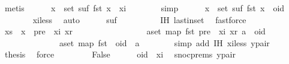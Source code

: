\begin{isabellebody}
\ metis\isanewline
\ \ \ \ \isamarkupfalse%
\ {\isachardoublequoteopen}{\isasymforall}x\ {\isasymin}\ set\ suf{\isachardot}\ fst\ x\ {\isacharless}\ xi{\isachardoublequoteclose}\isanewline
\ \ \ \ \ \ \isamarkupfalse%
\ simp\isanewline
\ \ \ \ \isamarkupfalse%
\ {\isachardoublequoteopen}{\isasymforall}x\ {\isasymin}\ set\ suf{\isachardot}\ fst\ x\ {\isacharless}\ oid{\isachardoublequoteclose}\isanewline
\ \ \ \ \ \ \isamarkupfalse%
\ xi{\isacharunderscore}less\ \isamarkupfalse%
\ auto\isanewline
\ \ \ \ \isamarkupfalse%
\ {\isachardoublequoteopen}suf\ {\isacharequal}\ {\isacharbrackleft}{\isacharbrackright}{\isachardoublequoteclose}\isanewline
\ \ \ \ \ \ \isamarkupfalse%
\ IH\ last{\isacharunderscore}in{\isacharunderscore}set\ \isamarkupfalse%
\ fastforce\isanewline
\ \ \ \ \isamarkupfalse%
\ {\isachardoublequoteopen}xs\ {\isacharat}\ {\isacharbrackleft}x{\isacharbrackright}\ {\isacharequal}\ {\isacharparenleft}pre\ {\isacharat}\ {\isacharbrackleft}{\isacharparenleft}xi{\isacharcomma}\ xr{\isacharparenright}{\isacharbrackright}{\isacharparenright}\ {\isacharat}\ {\isacharbrackleft}{\isacharbrackright}\ {\isasymand}\isanewline
\ \ \ \ \ \ \ \ \ \ \ \ \ \ {\isacharparenleft}{\isasymforall}a{\isasymin}set\ {\isacharparenleft}map\ fst\ {\isacharparenleft}{\isacharparenleft}pre\ {\isacharat}\ {\isacharbrackleft}{\isacharparenleft}xi{\isacharcomma}\ xr{\isacharparenright}{\isacharbrackright}{\isacharparenright}{\isacharparenright}{\isacharparenright}{\isachardot}\ a\ {\isacharless}\ oid{\isacharparenright}\ {\isasymand}\isanewline
\ \ \ \ \ \ \ \ \ \ \ \ \ \ {\isacharparenleft}{\isasymforall}a{\isasymin}set\ {\isacharparenleft}map\ fst\ {\isacharbrackleft}{\isacharbrackright}{\isacharparenright}{\isachardot}\ oid\ {\isacharless}\ a{\isacharparenright}{\isachardoublequoteclose}\isanewline
\ \ \ \ \ \ \isamarkupfalse%
\ {\isacharparenleft}simp\ add{\isacharcolon}\ IH\ xi{\isacharunderscore}less\ y{\isacharunderscore}pair{\isacharparenright}\isanewline
\ \ \ \ \isamarkupfalse%
\ \isamarkupfalse%
\ {\isacharquery}thesis\ \isamarkupfalse%
\ force\isanewline
\ \ \isamarkupfalse%
\isanewline
\ \ \ \ \isamarkupfalse%
\ False\isanewline
\ \ \ \ \isamarkupfalse%
\ {\isachardoublequoteopen}oid\ {\isacharless}\ xi{\isachardoublequoteclose}\ \isamarkupfalse%
\ snoc{\isachardot}prems{\isacharparenleft}{}{\isacharparenright}\ y{\isacharunderscore}pair\ \isamarkupfalse%

\end{isabellebody}
